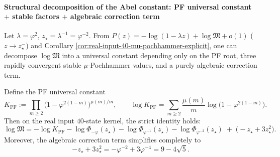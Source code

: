 \paragraph{Structural decomposition of the Abel constant: PF universal constant \texorpdfstring{$+$}{+} stable factors \texorpdfstring{$+$}{+} algebraic correction term}
Let \(\lambda=\varphi^2\), \(z_\star=\lambda^{-1}=\varphi^{-2}\). From \(P(z)=-\log(1-\lambda z)+\log\mathfrak{M}+o(1)\) (\(z\to z_\star^{-}\)) and Corollary \ref{cor:real-input-40-mu-pochhammer-explicit}, one can decompose \(\log\mathfrak M\) into a universal constant depending only on the PF root, three rapidly convergent stable \(\mu\)-Pochhammer values, and a purely algebraic correction term.
\begin{corollary}\label{cor:logM-mu-pochhammer-split}
Define the PF universal constant
\[
K_{\mathrm{PF}}
:=\prod_{m\ge 2}\bigl(1-\varphi^{2(1-m)}\bigr)^{\mu(m)/m},
\qquad
\log K_{\mathrm{PF}}
=\sum_{m\ge 2}\frac{\mu(m)}{m}\log\bigl(1-\varphi^{2(1-m)}\bigr).
\]
Then on the real input \(40\)-state kernel, the strict identity holds:
\[
\boxed{
\log\mathfrak{M}
=-\log K_{\mathrm{PF}}
-\log\Phi_{-\varphi}(z_\star)
-\log\Phi_{\varphi^{-1}}(z_\star)
-\log\Phi_{\varphi^{-2}}(z_\star)
\;+\;\bigl(-z_\star+3z_\star^2\bigr).
}
\]
Moreover, the algebraic correction term simplifies completely to
\[
-z_\star+3z_\star^2=-\varphi^{-2}+3\varphi^{-4}=9-4\sqrt5.
\]
\end{corollary}







